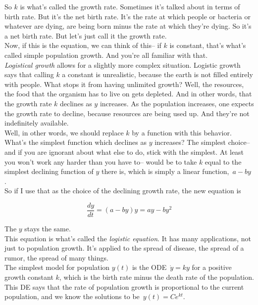 So $k$ is what's called the growth rate.
Sometimes it's talked about in terms of birth rate.
But it's the net birth rate.
It's the rate at which people or bacteria or whatever are dying,
are being born minus the rate at which they're dying.
So it's a net birth rate.
But let's just call it the growth rate.\\
Now, if this is the equation, we can think of this--
if $k$ is constant, that's what's called simple population
growth. And you're all familiar with that.\\

\emph{Logistical growth} allows for a slightly more complex
situation.
Logistic growth says that calling $k$ a constant is unrealistic,
because the earth is not filled entirely with people.
What stops it from having unlimited growth?
Well, the resources, the food that the organism has to live on gets depleted.
And in other words, that the growth rate $k$ declines as $y$ increases.
As the population increases, one expects the growth rate
to decline, because resources are being used up.
And they're not indefinitely available.\\
Well, in other words, we should replace $k$ by a function with this behavior.
What's the simplest function which declines as $y$ increases?
The simplest choice-- and if you are ignorant about what else
to do, stick with the simplest.
At least you won't work any harder
than you have to-- would be to take $k$ equal to the simplest
declining function of $y$ there is, which is simply
a linear function, $\, a -  by\,$.\\
So if I use that as the choice of the declining growth rate,
the new equation is

\begin{equation*}
  \frac{dy}{dt} = (a - by)y = ay -by^2
\end{equation*}

The $y$ stays the same.\\
This equation is what's called the \emph{logistic equation}.
It has many applications, not just to population growth.
It's applied to the spread of disease, the spread of a rumor,
the spread of many things.\\

The simplest model for population $y(t)$ is the ODE $\, \dot y = ky$ for a positive growth constant $k$,
which is the birth rate minus the death rate of the population.
This DE says that the rate of population growth is proportional to the current population,
and we know the solutions to be $\, y(t) = Ce^{kt}$. 

